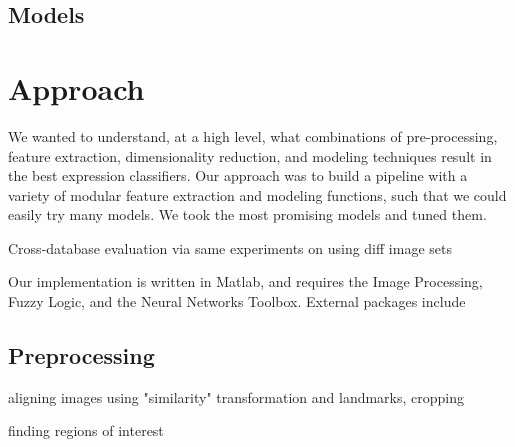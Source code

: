 \documentclass[10pt,twocolumn,letterpaper]{article}
\begin{document}





\subsection{Models}








\section{Approach}
We wanted to understand, at a high level, what combinations of pre-processing, feature extraction, dimensionality reduction, and modeling techniques result in the best expression classifiers. Our approach was to build a pipeline with a variety of modular feature extraction and modeling functions, such that we could easily try many models. We took the most promising models and tuned them.

Cross-database evaluation via same experiments on using diff image sets

Our implementation is written in Matlab, and requires the Image Processing, Fuzzy Logic, and the Neural Networks Toolbox. External packages include 

\subsection{Preprocessing}
aligning images using "similarity" transformation and landmarks, 
cropping

finding regions of interest

\end{document}
